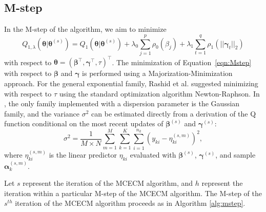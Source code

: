 \subsection{M-step}
\label{sec:mstep}
In the M-step of the algorithm, we aim to minimize \begin{equation}
  Q_{1,\lambda}(\boldsymbol\theta | \boldsymbol\theta^{(s)}) = Q_1(\boldsymbol\theta | \boldsymbol\theta^{(s)}) + \lambda_0 \sum_{j=1}^{p} \rho_0 \left (\beta_j \right ) + \lambda_1 \sum_{t=1}^{q} \rho_1 \left (||\boldsymbol\gamma_t||_2 \right )
  \label{eqn:Mstep}
\end{equation} with respect to
\(\boldsymbol \theta = (\boldsymbol \beta^\top, \boldsymbol \gamma^\top, \tau)^\top\).
The minimization of Equation~\ref{eqn:Mstep} with respect to
\(\boldsymbol \beta\) and \(\boldsymbol \gamma\) is performed using a
Majorization-Minimization approach. For the general
exponential family, Rashid et al. \citeyearpar{rashid2020} suggested
minimizing with respect to \(\tau\) using the standard optimization
algorithm Newton-Raphson. In , the only family implemented
with a dispersion parameter is the Gaussian family, and the variance
\(\sigma^2\) can be estimated directly from a derivation of the Q
function conditional on the most recent updates of
\(\boldsymbol \beta^{(s)}\) and \(\boldsymbol \gamma^{(s)}\):
\begin{equation}
  \sigma^2 = \frac{1}{M\times N} \sum_{m=1}^M \sum_{k=1}^K \sum_{i=1}^{n_k} (y_{ki} - \eta_{ki}^{(s,m)})^2,
  \label{eqn:sigma}
\end{equation} where \(\eta_{ki}^{(s,m)}\) is the linear predictor
\(\eta_{ki}\) evaluated with \(\boldsymbol \beta^{(s)}\),
\(\boldsymbol \gamma^{(s)}\), and sample
\(\boldsymbol \alpha_k^{(s,m)}\).

Let $s$ represent the iteration of the MCECM algorithm, and $h$ represent the iteration within a particular M-step of the MCECM algorithm. The M-step of the \(s^{th}\) iteration of the MCECM algorithm proceeds
as in Algorithm \ref{alg:mstep}.

